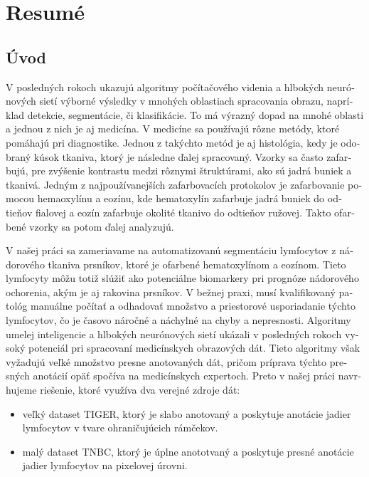\chapter{Resumé}
\begin{otherlanguage}{slovak}

\section{Úvod}
V posledných rokoch ukazujú algoritmy počítačového videnia a hlbokých neurónových sietí výborné výsledky v mnohých oblastiach spracovania obrazu, napríklad detekcie, segmentácie, či klasifikácie. To má výrazný dopad na mnohé oblasti a jednou z nich je aj medicína. V medicíne sa používajú rôzne metódy, ktoré pomáhajú pri diagnostike. Jednou z takýchto metód je aj histológia, kedy je odobraný kúsok tkaniva, ktorý je následne ďalej spracovaný. Vzorky sa často zafarbujú, pre zvýšenie kontrastu medzi rôznymi štruktúrami, ako sú jadrá buniek a tkanivá. Jedným z najpoužívanejších zafarbovacích protokolov je zafarbovanie pomocou hemaoxylínu a eozínu, kde hematoxylín zafarbuje jadrá buniek do odtieňov fialovej a eozín zafarbuje okolité tkanivo do odtieňov ružovej. Takto ofarbené vzorky sa potom ďalej analyzujú.

V našej práci sa zameriavame na automatizovanú segmentáciu lymfocytov z nádorového tkaniva prsníkov, ktoré je ofarbené hematoxylínom a eozínom. Tieto lymfocyty môžu totiž slúžiť ako potenciálne biomarkery pri prognóze nádorového ochorenia, akým je aj rakovina prsníkov. V bežnej praxi, musí kvalifikovaný patológ manuálne počítať a odhadovať množstvo a priestorové usporiadanie týchto lymfocytov, čo je časovo náročné a náchylné na chyby a nepresnosti. Algoritmy umelej inteligencie a hlbokých neurónových sietí ukázali v posledných rokoch vysoký potenciál pri spracovaní medicínskych obrazových dát. Tieto algoritmy však vyžadujú veľké množstvo presne anotovaných dát, pričom príprava týchto presných anotácií opäť spočíva na medicínskych expertoch. Preto v našej práci navrhujeme riešenie, ktoré využíva dva verejné zdroje dát:

\begin{itemize}
    \item veľký dataset TIGER, ktorý je slabo anotovaný a poskytuje anotácie jadier lymfocytov v tvare ohraničujúcich rámčekov.
    \item malý dataset TNBC, ktorý je úplne anototvaný a poskytuje presné anotácie jadier lymfocytov na pixelovej úrovni.
\end{itemize}


\end{otherlanguage}
